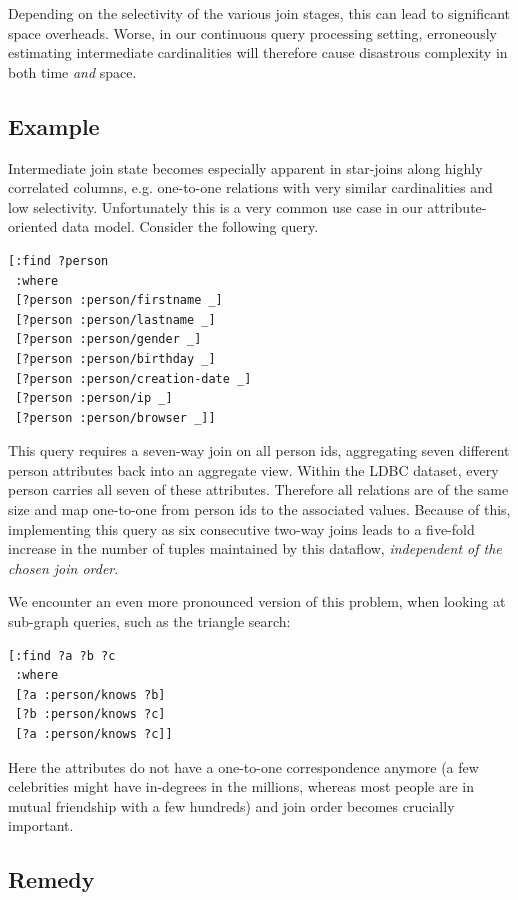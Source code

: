 \documentclass[../catalog.tex]{subfiles}
\begin{document}
Depending on the selectivity of the various join stages, this can lead
to significant space overheads. Worse, in our continuous query
processing setting, erroneously estimating intermediate cardinalities
will therefore cause disastrous complexity in both time \emph{and}
space.

\subsection{Example}

Intermediate join state becomes especially apparent in star-joins
along highly correlated columns, e.g. one-to-one relations with very
similar cardinalities and low selectivity. Unfortunately this is a
very common use case in our attribute-oriented data model. Consider
the following query.

\begin{verbatim}
[:find ?person
 :where
 [?person :person/firstname _]
 [?person :person/lastname _]
 [?person :person/gender _]
 [?person :person/birthday _]
 [?person :person/creation-date _]
 [?person :person/ip _]
 [?person :person/browser _]]
\end{verbatim}

This query requires a seven-way join on all person ids, aggregating
seven different person attributes back into an aggregate view. Within
the LDBC dataset, every person carries all seven of these
attributes. Therefore all relations are of the same size and map
one-to-one from person ids to the associated values. Because of this,
implementing this query as six consecutive two-way joins leads to a
five-fold increase in the number of tuples maintained by this
dataflow, \emph{independent of the chosen join order}.

We encounter an even more pronounced version of this problem, when
looking at sub-graph queries, such as the triangle search:

\begin{verbatim}
[:find ?a ?b ?c
 :where
 [?a :person/knows ?b]
 [?b :person/knows ?c]
 [?a :person/knows ?c]]
\end{verbatim}

Here the attributes do not have a one-to-one correspondence anymore (a
few celebrities might have in-degrees in the millions, whereas most
people are in mutual friendship with a few hundreds) and join order
becomes crucially important.

\subsection{Remedy}
\end{document}
